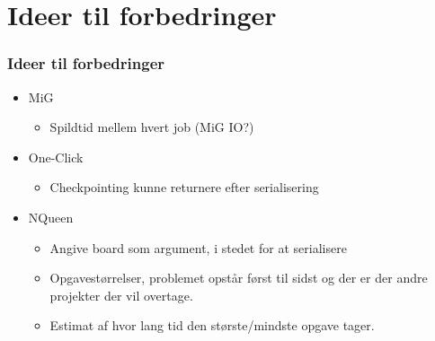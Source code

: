 \documentclass{beamer}
\begin{document}
\section{Ideer til forbedringer}
\frame
{
  \frametitle{Ideer til forbedringer}

  \begin{itemize}
		\item<+-> MiG
		\begin{itemize}
			\item<+-> Spildtid mellem hvert job (MiG IO?)
		\end{itemize}
		\item<+-> One-Click
		\begin{itemize}
			\item<+-> Checkpointing kunne returnere efter serialisering
		\end{itemize}
		\item<+-> NQueen 
		\begin{itemize}
			\item<+-> Angive board som argument, i stedet for at serialisere
			\item<+-> Opgavestørrelser, problemet opstår først til sidst og der er der andre projekter der vil overtage.      
			\item<+-> Estimat af hvor lang tid den største/mindste opgave tager. 
		\end{itemize}
  \end{itemize}
}
\end{document}
